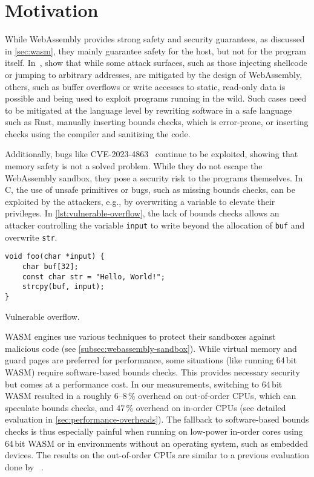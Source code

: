 \chapter{Motivation}
\label{ch:motivation}

While WebAssembly provides strong safety and security guarantees, as discussed in \cref{sec:wasm}, they mainly guarantee safety for the host, but not for the program itself.
In~\cite{lehmann2020everything}, \citeauthor*{lehmann2020everything} show that while some attack surfaces, such as those injecting shellcode or jumping to arbitrary addresses, are mitigated by the design of WebAssembly, others, such as buffer overflows or write accesses to static, read-only data is possible and being used to exploit programs running in the wild.
Such cases need to be mitigated at the language level by rewriting software in a safe language such as Rust, manually inserting bounds checks, which is error-prone, or inserting checks using the compiler and sanitizing the code.

Additionally, bugs like {CVE-2023-4863}~\cite{CVE-2023-4863} continue to be exploited, showing that memory safety is not a solved problem.
While they do not escape the WebAssembly sandbox, they pose a security risk to the programs themselves.
In C, the use of unsafe primitives or bugs, such as missing bounds checks, can be exploited by the attackers, e.g., by overwriting a variable to elevate their privileges.
In \cref{lst:vulnerable-overflow}, the lack of bounds checks allows an attacker controlling the variable \texttt{input} to write beyond the allocation of \texttt{buf} and overwrite \texttt{str}.

\begin{lstfloat}[h]
    \centering
    \begin{lstlisting}[frame=h,style=customc,label={lst:vulnerable-overflow-inner}]
void foo(char *input) {
    char buf[32];
    const char str = "Hello, World!";
    strcpy(buf, input);
}
    \end{lstlisting}
    \caption{Vulnerable overflow.}
    \label{lst:vulnerable-overflow}
\end{lstfloat}

\Ac{WASM} engines use various techniques to protect their sandboxes against malicious code (see \cref{subsec:webassembly-sandbox}).
While virtual memory and guard pages are preferred for performance, some situations (like running 64\,bit \ac{WASM}) require software-based bounds checks.
This provides necessary security but comes at a performance cost.
In our measurements, switching to 64\,bit \ac{WASM} resulted in a roughly 6--8\,\% overhead on out-of-order CPUs, which can speculate bounds checks, and 47\,\% overhead on in-order CPUs (see detailed evaluation in \cref{sec:performance-overheads}).
The fallback to software-based bounds checks is thus especially painful when running on low-power in-order cores using 64\,bit \ac{WASM} or in environments without an operating system, such as embedded devices.
The results on the out-of-order CPUs are similar to a previous evaluation done by \citeauthor*{szewczyk2022leaps}~\cite{szewczyk2022leaps}.

